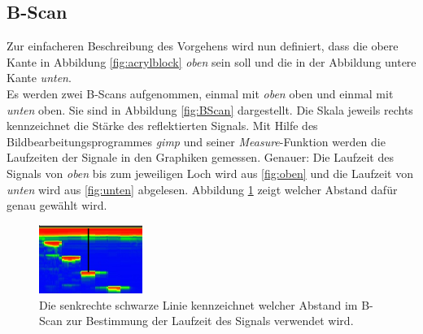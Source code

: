 \subsection{B-Scan\label{sec:BScan}}
Zur einfacheren Beschreibung des Vorgehens wird nun definiert, dass die obere Kante in Abbildung \ref{fig:acrylblock} \emph{oben} sein soll und die in der Abbildung untere Kante \emph{unten}. \\
Es werden zwei B-Scans aufgenommen, einmal mit \emph{oben} oben und einmal mit \emph{unten} oben. Sie sind in Abbildung \ref{fig:BScan} dargestellt. Die Skala jeweils rechts kennzeichnet die Stärke des reflektierten Signals. Mit Hilfe des Bildbearbeitungsprogrammes \emph{gimp} und seiner \emph{Measure}-Funktion werden die Laufzeiten der Signale in den Graphiken gemessen. Genauer: Die Laufzeit des Signals von \emph{oben} bis zum jeweiligen Loch wird aus \ref{fig:oben} und die Laufzeit von \emph{unten} wird aus \ref{fig:unten} abgelesen. Abbildung \ref{fig:Schema} zeigt welcher Abstand dafür genau gewählt wird.
\begin{figure}[h!]
	\centering
	\includegraphics[width=0.3\textwidth]{Schema.png}
	\caption{Die senkrechte schwarze Linie kennzeichnet welcher Abstand im B-Scan zur Bestimmung der Laufzeit des Signals verwendet wird.}
	\label{fig:Schema}
\end{figure} \\
